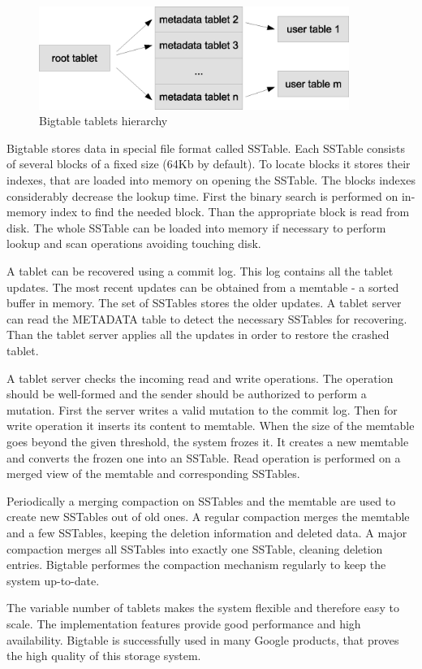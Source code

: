 \begin{figure}
  \centering
  \includegraphics [width=0.9\textwidth]{images/bigtable_tablets_hierarchy}
  \caption{Bigtable tablets hierarchy}
  \label{fig:bigtable_tablets_hierarchy}
\end{figure}

Bigtable stores data in special file format called SSTable.
Each SSTable consists of several blocks of a fixed size (64Kb by default). 
To locate blocks it stores their indexes, that are loaded into memory on opening the SSTable.
The blocks indexes considerably decrease the lookup time.
First the binary search is performed on in-memory index to find the needed block.
Than the appropriate block is read from disk.
The whole SSTable can be loaded into memory if necessary to perform lookup and scan operations avoiding touching disk.

A tablet can be recovered using a commit log.
This log contains all the tablet updates.
The most recent updates can be obtained from a memtable - a sorted buffer in memory.
The set of SSTables stores the older updates. 
A tablet server can read the METADATA table to detect the necessary SSTables for recovering.
Than the tablet server applies all the updates in order to restore the crashed tablet. 
  
A tablet server checks the incoming read and write operations.
The operation should be well-formed and the sender should be authorized to perform a mutation.
First the server writes a valid mutation to the commit log.
Then for write operation it inserts its content to memtable.
When the size of the memtable goes beyond the given threshold, the system frozes it.
It creates a new memtable and converts the frozen one into an SSTable. 
Read operation is performed on a merged view of the memtable and corresponding SSTables.

Periodically a merging compaction on SSTables and the memtable are used to create new SSTables out of old ones.
A regular compaction merges the memtable and a few SSTables, keeping the deletion information and deleted data.
A major compaction merges all SSTables into exactly one SSTable, cleaning deletion entries.
Bigtable performes the compaction mechanism regularly to keep the system up-to-date.

The variable number of tablets makes the system flexible and therefore easy to scale.
The implementation features provide good performance and high availability.
Bigtable is successfully used in many Google products, that proves the high quality of this storage system.